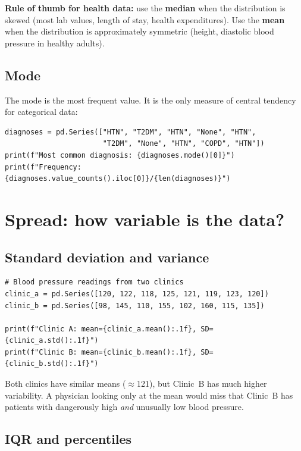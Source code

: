 \begin{clinicalnote}
\textbf{Rule of thumb for health data:} use the \textbf{median} when the distribution is skewed (most lab values, length of stay, health expenditures). Use the \textbf{mean} when the distribution is approximately symmetric (height, diastolic blood pressure in healthy adults).
\end{clinicalnote}

\subsection{Mode}

The mode is the most frequent value. It is the only measure of central tendency for categorical data:

\begin{verbatim}
diagnoses = pd.Series(["HTN", "T2DM", "HTN", "None", "HTN",
                       "T2DM", "None", "HTN", "COPD", "HTN"])
print(f"Most common diagnosis: {diagnoses.mode()[0]}")
print(f"Frequency: {diagnoses.value_counts().iloc[0]}/{len(diagnoses)}")
\end{verbatim}

\section{Spread: how variable is the data?}

\subsection{Standard deviation and variance}

\begin{verbatim}
# Blood pressure readings from two clinics
clinic_a = pd.Series([120, 122, 118, 125, 121, 119, 123, 120])
clinic_b = pd.Series([98, 145, 110, 155, 102, 160, 115, 135])

print(f"Clinic A: mean={clinic_a.mean():.1f}, SD={clinic_a.std():.1f}")
print(f"Clinic B: mean={clinic_b.mean():.1f}, SD={clinic_b.std():.1f}")
\end{verbatim}

Both clinics have similar means ($\approx$121), but Clinic~B has much higher variability. A physician looking only at the mean would miss that Clinic~B has patients with dangerously high \emph{and} unusually low blood pressure.

\subsection{IQR and percentiles}

